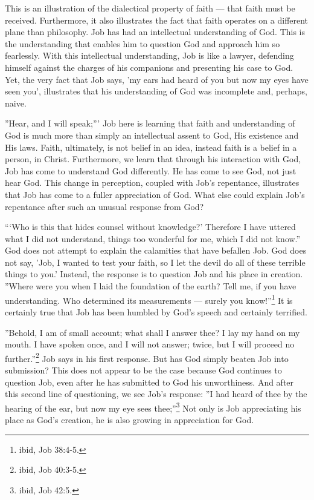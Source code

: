 This is an illustration of the dialectical property of faith --- that faith must be received. Furthermore, it also illustrates the fact that faith operates on a different plane than philosophy. Job has had an intellectual understanding of God. This is the understanding that enables him to question God and approach him so fearlessly. With this intellectual understanding, Job is like a lawyer, defending himself against the charges of his companions and presenting his case to God. Yet, the very fact that Job says, 'my ears had heard of you but now my eyes have seen you', illustrates that his understanding of God was incomplete and, perhaps, naive.

''Hear, and I will speak;''' Job here is learning that faith and understanding of God is much more than simply an intellectual assent to God, His existence and His laws. Faith, ultimately, is not belief in an idea, instead faith is a belief in a person, in Christ. Furthermore, we learn that through his interaction with God, Job has come to understand God differently. He has come to see God, not just hear God. This change in perception, coupled with Job's repentance, illustrates that Job has come to a fuller appreciation of God. What else could explain Job's repentance after such an unusual response from God? 

```Who is this that hides counsel without knowledge?' Therefore I have uttered what I did not understand, things too wonderful for me, which I did not know.'' God does not attempt to explain the calamities that have befallen Job. God does not say, 'Job, I wanted to test your faith, so I let the devil do all of these terrible things to you.' Instead, the response is to question Job and his place in creation. ''Where were you when I laid the foundation of the earth? Tell me, if you have understanding. Who determined its measurements --- surely you know!''\footnote{ibid, Job 38:4-5.} It is certainly true that Job has been humbled by God's speech and certainly terrified. 

''Behold, I am of small account; what shall I answer thee? I lay my hand on my mouth. I have spoken once, and I will not answer; twice, but I will proceed no further.''\footnote{ibid, Job 40:3-5.} Job says in his first response. But has God simply beaten Job into submission? This does not appear to be the case because God continues to question Job, even after he has submitted to God his unworthiness. And after this second line of questioning, we see Job's response: ''I had heard of thee by the hearing of the ear, but now my eye sees thee;''\footnote{ibid, Job 42:5.} Not only is Job appreciating his place as God's creation, he is also growing in appreciation for God.


